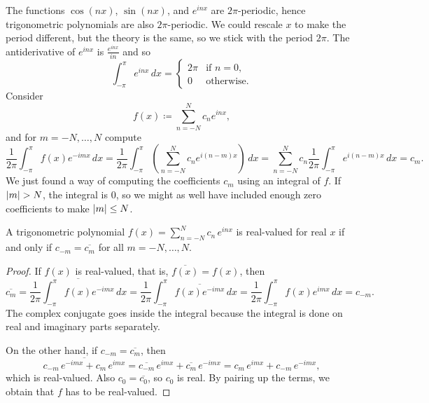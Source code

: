 \medskip

The functions $\cos (nx)$, $\sin (nx)$, and $e^{inx}$ are $2\pi$-periodic,
hence
trigonometric
polynomials are also $2\pi$-periodic.
We could rescale $x$ to make the period different, but the theory is the
same, so we stick with the period $2\pi$.
The antiderivative of $e^{inx}$ is $\frac{e^{inx}}{in}$ and
so
\begin{equation*}
\int_{-\pi}^\pi e^{inx} \, dx =
\begin{cases}
2\pi & \text{if } n=0, \\
0    & \text{otherwise.}
\end{cases}
\end{equation*}
Consider
\begin{equation*}
f(x) \coloneqq \sum_{n=-N}^N c_n e^{inx} ,
\end{equation*}
and for $m=-N,\ldots,N$ compute
\begin{equation*}
\frac{1}{2\pi} \int_{-\pi}^\pi
f(x) e^{-imx} \, dx
=
\frac{1}{2\pi} \int_{-\pi}^\pi
\left(\sum_{n=-N}^N c_n e^{i(n-m)x}\right) \, dx
=
\sum_{n=-N}^N
c_n
\frac{1}{2\pi}
\int_{-\pi}^\pi
e^{i(n-m)x}
 \, dx
=
c_m .
\end{equation*}
We just found a way of computing the coefficients $c_m$ using an integral
of $f$.  If $\lvert {m} \rvert > N$, the integral is 0, so we might as
well have included enough zero coefficients to make $\lvert {m} \rvert \leq N$.

\begin{prop}
A trigonometric polynomial
$f(x) = \sum_{n=-N}^N c_n\, e^{inx}$
is real-valued for real $x$ if
and only if $c_{-m} = \overline{c_m}$ for all $m=-N,\ldots,N$.
\end{prop}

\begin{proof}
If $f(x)$ is real-valued, that is, $\overline{f(x)} = f(x)$, then
\begin{equation*}
\overline{c_m}
=
\overline{
\frac{1}{2\pi} \int_{-\pi}^\pi
f(x) e^{-imx} \, dx
}
=
\frac{1}{2\pi} \int_{-\pi}^\pi
\overline{
f(x) e^{-imx} } \, dx
=
\frac{1}{2\pi} \int_{-\pi}^\pi
f(x) e^{imx} \, dx
= c_{-m} .
\end{equation*}
The complex conjugate goes inside the integral because the integral is
done on real and imaginary parts separately.

On the other hand, if 
$c_{-m} = \overline{c_m}$, then
\begin{equation*}
\overline{c_{-m}\, e^{-imx}+ c_{m}\, e^{imx}}
=
\overline{c_{-m}}\, e^{imx}+ \overline{c_{m}}\, e^{-imx}
=
c_{m}\, e^{imx}+ c_{-m}\, e^{-imx} ,
\end{equation*}
which is real-valued.  Also $c_0 = \overline{c_0}$, so
$c_0$ is real.
By pairing up the terms, we obtain that $f$ has to be real-valued.
\end{proof}

